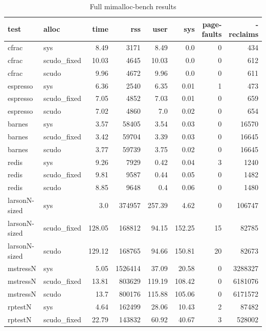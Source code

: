 \documentclass[a4paper,11pt,oneside]{report}
\begin{document}
\begin{longtable}[h]{l l r r r r r r}
  \caption{Full mimalloc-bench results}\label{tab:FullMimallocBench} \\

  \toprule
  test & alloc & time & rss & user & sys & page-faults & -reclaims \\
  \midrule
  \endhead{}
  cfrac & sys & 8.49 & 3171 & 8.49 & 0.0 & 0 & 434 \\
  \midrule
  cfrac & scudo\_fixed & 10.03 & 4645 & 10.03 & 0.0 & 0 & 612 \\
  \midrule
  cfrac & scudo & 9.96 & 4672 & 9.96 & 0.0 & 0 & 611 \\
  \midrule
  espresso & sys & 6.36 & 2540 & 6.35 & 0.01 & 1 & 473 \\
  \midrule
  espresso & scudo\_fixed & 7.05 & 4852 & 7.03 & 0.01 & 0 & 659 \\
  \midrule
  espresso & scudo & 7.02 & 4860 & 7.0 & 0.02 & 0 & 654 \\
  \midrule
  barnes & sys & 3.57 & 58405 & 3.54 & 0.03 & 0 & 16570 \\
  \midrule
  barnes & scudo\_fixed & 3.42 & 59704 & 3.39 & 0.03 & 0 & 16645 \\
  \midrule
  barnes & scudo & 3.77 & 59739 & 3.75 & 0.02 & 0 & 16645 \\
  \midrule
  redis & sys & 9.26 & 7929 & 0.42 & 0.04 & 3 & 1240 \\
  \midrule
  redis & scudo\_fixed & 9.81 & 9587 & 0.44 & 0.05 & 0 & 1482 \\
  \midrule
  redis & scudo & 8.85 & 9648 & 0.4 & 0.06 & 0 & 1480 \\
  \midrule
  larsonN-sized & sys & 3.0 & 374957 & 257.39 & 4.62 & 0 & 106747 \\
  \midrule
  larsonN-sized & scudo\_fixed & 128.05 & 168812 & 94.15 & 152.25 & 15 & 82785 \\
  \midrule
  larsonN-sized & scudo & 129.12 & 168765 & 94.66 & 150.81 & 20 & 82673 \\
  \midrule
  mstressN & sys & 5.05 & 1526414 & 37.09 & 20.58 & 0 & 3288327 \\
  \midrule
  mstressN & scudo\_fixed & 13.81 & 803629 & 119.19 & 108.42 & 0 & 6181076 \\
  \midrule
  mstressN & scudo & 13.7 & 800176 & 115.88 & 105.06 & 0 & 6171572 \\
  \midrule
  rptestN & sys & 4.64 & 162499 & 28.06 & 10.43 & 2 & 87482 \\
  \midrule
  rptestN & scudo\_fixed & 22.79 & 143832 & 60.92 & 40.67 & 3 & 528002 \\

\end{longtable}
\end{document}
